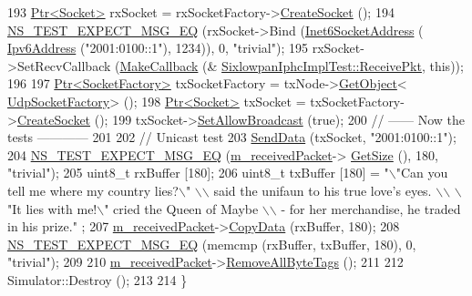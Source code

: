 \begin{DoxyCode}
193   \hyperlink{classns3_1_1Ptr}{Ptr<Socket>} rxSocket = rxSocketFactory->\hyperlink{classns3_1_1SocketFactory_a97351e6e7860503a4912042530449f62}{CreateSocket} ();
194   \hyperlink{group__testing_ga7304ba46a28d8cf08dfdfd6499cf7068}{NS\_TEST\_EXPECT\_MSG\_EQ} (rxSocket->Bind (\hyperlink{classns3_1_1Inet6SocketAddress}{Inet6SocketAddress} (
      \hyperlink{classns3_1_1Ipv6Address}{Ipv6Address} (\textcolor{stringliteral}{"2001:0100::1"}), 1234)), 0, \textcolor{stringliteral}{"trivial"});
195   rxSocket->SetRecvCallback (\hyperlink{group__makecallbackmemptr_ga9376283685aa99d204048d6a4b7610a4}{MakeCallback} (&
      \hyperlink{classSixlowpanIphcImplTest_ac90ce22d919fbddc1906333b102c6a35}{SixlowpanIphcImplTest::ReceivePkt}, \textcolor{keyword}{this}));
196 
197   \hyperlink{classns3_1_1Ptr}{Ptr<SocketFactory>} txSocketFactory = txNode->\hyperlink{classns3_1_1Object_a13e18c00017096c8381eb651d5bd0783}{GetObject}<
      \hyperlink{classns3_1_1UdpSocketFactory}{UdpSocketFactory}> ();
198   \hyperlink{classns3_1_1Ptr}{Ptr<Socket>} txSocket = txSocketFactory->\hyperlink{classns3_1_1SocketFactory_a97351e6e7860503a4912042530449f62}{CreateSocket} ();
199   txSocket->\hyperlink{classns3_1_1Socket_a32b4fa27b732a63207c8d9054a817ed5}{SetAllowBroadcast} (\textcolor{keyword}{true});
200   \textcolor{comment}{// ------ Now the tests ------------}
201 
202   \textcolor{comment}{// Unicast test}
203   \hyperlink{classSixlowpanIphcImplTest_a3e0d368bdbde2e52d3c70488e124ab5e}{SendData} (txSocket, \textcolor{stringliteral}{"2001:0100::1"});
204   \hyperlink{group__testing_ga7304ba46a28d8cf08dfdfd6499cf7068}{NS\_TEST\_EXPECT\_MSG\_EQ} (\hyperlink{classSixlowpanIphcImplTest_a1462936c804a6cdb9cd52ce499932df8}{m\_receivedPacket}->
      \hyperlink{classns3_1_1Packet_a462855c9929954d4301a4edfe55f4f1c}{GetSize} (), 180, \textcolor{stringliteral}{"trivial"});
205   uint8\_t rxBuffer [180];
206   uint8\_t txBuffer [180] = \textcolor{stringliteral}{"\(\backslash\)"Can you tell me where my country lies?\(\backslash\)" \(\backslash\)\(\backslash\) said the unifaun to his true
       love's eyes. \(\backslash\)\(\backslash\) \(\backslash\)"It lies with me!\(\backslash\)" cried the Queen of Maybe \(\backslash\)\(\backslash\) - for her merchandise, he traded in his prize."}
      ;
207   \hyperlink{classSixlowpanIphcImplTest_a1462936c804a6cdb9cd52ce499932df8}{m\_receivedPacket}->\hyperlink{classns3_1_1Packet_a5a6d304b9e0d90733919ffe224b98f0d}{CopyData} (rxBuffer, 180);
208   \hyperlink{group__testing_ga7304ba46a28d8cf08dfdfd6499cf7068}{NS\_TEST\_EXPECT\_MSG\_EQ} (memcmp (rxBuffer, txBuffer, 180), 0, \textcolor{stringliteral}{"trivial"});
209 
210   \hyperlink{classSixlowpanIphcImplTest_a1462936c804a6cdb9cd52ce499932df8}{m\_receivedPacket}->\hyperlink{classns3_1_1Packet_a083f54c9db31aeff30551a9e20fcda42}{RemoveAllByteTags} ();
211 
212   Simulator::Destroy ();
213 
214 \}
\end{DoxyCode}


